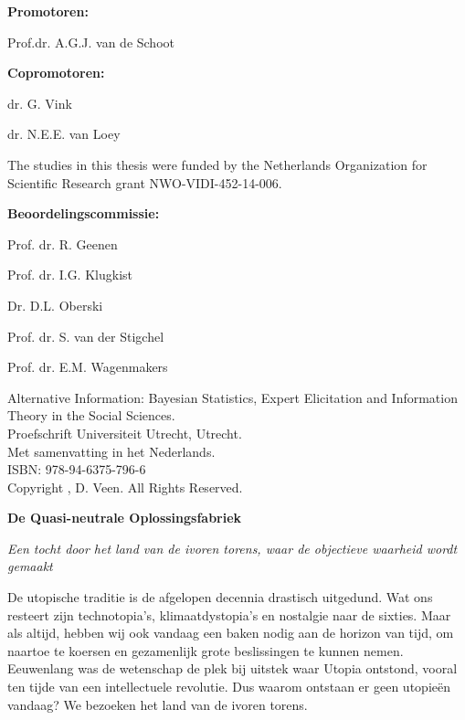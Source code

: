 \newpage

\pagestyle{empty}
\textbf{Promotoren:}


Prof.dr. A.G.J. van de Schoot

\textbf{Copromotoren:}

dr. G. Vink

dr. N.E.E. van Loey

\vspace*{\fill}

\noindent The studies in this thesis were funded by the Netherlands Organization for Scientific Research grant NWO-VIDI-452-14-006.

% 

\newpage


\textbf{Beoordelingscommissie:}

Prof. dr. R. Geenen

Prof. dr. I.G. Klugkist

Dr. D.L. Oberski 

Prof. dr. S. van der Stigchel

Prof. dr. E.M. Wagenmakers 

\vspace*{\fill}


\noindent Alternative Information: Bayesian Statistics, Expert Elicitation and Information Theory in the Social Sciences.\\
\noindent Proefschrift Universiteit Utrecht, Utrecht. \\
\noindent Met samenvatting in het Nederlands. \\

\noindent ISBN: 978-94-6375-796-6 \\
\noindent Copyright , D. Veen. All Rights Reserved.



\newpage

\textbf{De Quasi-neutrale Oplossingsfabriek}

\textit{Een tocht door het land van de ivoren torens, waar de objectieve waarheid wordt gemaakt}

De utopische traditie is de afgelopen decennia drastisch uitgedund. Wat ons resteert zijn technotopia's, klimaatdystopia's en nostalgie naar de sixties. Maar als altijd, hebben wij ook vandaag een baken nodig aan de horizon van tijd, om naartoe te koersen en gezamenlijk grote beslissingen te kunnen nemen. Eeuwenlang was de wetenschap de plek bij uitstek waar Utopia ontstond, vooral ten tijde van een intellectuele revolutie. Dus waarom ontstaan er geen utopieën vandaag? We bezoeken het land van de ivoren torens.

